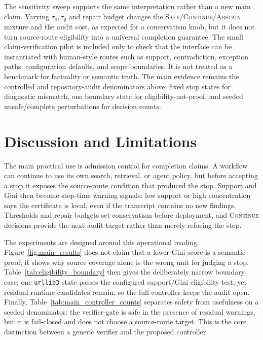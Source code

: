 \documentclass[letterpaper,10pt,twocolumn]{article}
\newcommand{\safe}{\textsc{Safe}}
\newcommand{\cont}{\textsc{Continue}}
\newcommand{\abstain}{\textsc{Abstain}}
\begin{document}
The sensitivity sweep supports the same interpretation rather than a new main
claim. Varying \(\tau_s,\tau_g\) and repair budget changes the
\safe{}/\cont{}/\abstain{} mixture and the audit cost, as expected for a
conservatism knob, but it does not turn source-route eligibility into a
universal completion guarantee. The small claim-verification pilot is included
only to check that the interface can be instantiated with human-style routes
such as support, contradiction, exception paths, configuration defaults, and
scope boundaries. It is not treated as a benchmark for factuality or semantic
truth. The main evidence remains the controlled and repository-audit
denominators above: fixed stop states for diagnostic mismatch, one boundary
state for eligibility-not-proof, and seeded unsafe/complete perturbations for
decision counts.

\FloatBarrier

\section{Discussion and Limitations}

The main practical use is admission control for completion claims. A workflow
can continue to use its own search, retrieval, or agent policy, but before
accepting a stop it exposes the source-route condition that produced the stop.
Support and Gini then become stop-time warning signals: low support or high
concentration says the certificate is local, even if the transcript contains no
new findings. Thresholds and repair budgets set conservatism before deployment,
and \cont{} decisions provide the next audit target rather than merely refusing
the stop.

The experiments are designed around this operational reading. Figure~\ref{fig:main_results}
does not claim that a lower Gini score is a semantic proof; it shows why source
coverage alone is the wrong unit for judging a stop. Table~\ref{tab:eligibility_boundary}
then gives the deliberately narrow boundary case: one \texttt{urllib3} state
passes the configured support/Gini eligibility test, yet residual runtime
candidates remain, so the full controller keeps the audit open. Finally,
Table~\ref{tab:main_controller_counts} separates safety from usefulness on a
seeded denominator: the verifier-gate is safe in the presence of residual
warnings, but it is fail-closed and does not choose a source-route target. This
is the core distinction between a generic verifier and the proposed controller.
\end{document}
